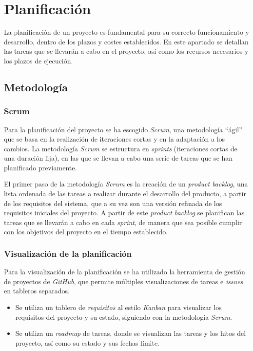 \chapter{Planificación}\label{chap:planif}
La planificación de un proyecto es fundamental para su correcto funcionamiento y desarrollo,
dentro de los plazos y costes establecidos. En este apartado se detallan las tareas que se
llevarán a cabo en el proyecto, así como los recursos necesarios y los plazos de ejecución.

\section{Metodología}\label{sec:metodología}
\subsection{Scrum}\label{subsec:scrum}
Para la planificación del proyecto se ha escogido \textit{Scrum}, una metodología ``ágil'' que se
basa en la realización de iteraciones cortas y en la adaptación a los cambios. La metodología
\textit{Scrum} se estructura en \textit{sprints} (iteraciones cortas de una duración fija),
en las que se llevan a cabo una serie de tareas que se han planificado previamente.

El primer paso de la metodología \textit{Scrum} es la creación de un \textit{product backlog},
una lista ordenada de las tareas a realizar durante el desarrollo del producto, a partir de los
requisitos del sistema, que a su vez son una versión refinada de los requisitos iniciales del
proyecto. A partir de este \textit{product backlog} se planifican las tareas que se llevarán
a cabo en cada \textit{sprint}, de manera que sea posible cumplir con los objetivos del proyecto
en el tiempo establecido.

\subsection{Visualización de la planificación}\label{subsec:visual_planif}
Para la visualización de la planificación se ha utilizado la herramienta de gestión de proyectos
de \textit{GitHub}, que permite múltiples visualizaciones de tareas e \textit{issues} en tableros
separados.

\begin{itemize}
	\item Se utiliza un tablero de \textit{requisitos} al estilo \textit{Kanban} para visualizar
		los requisitos del proyecto y su estado, siguiendo con la metodología \textit{Scrum}.
	\item Se utiliza un \textit{roadmap} de tareas, donde se visualizan las tareas y los hitos
		del proyecto, así como su estado y sus fechas límite.
\end{itemize}

